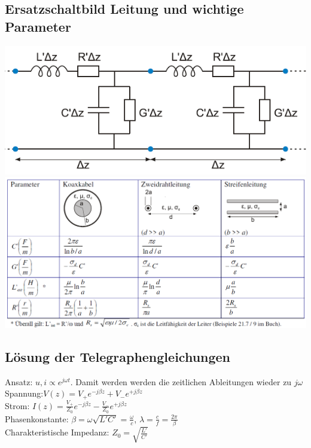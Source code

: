\documentclass[english]{latex4ei/latex4ei_sheet}
\begin{document}
\begin{sectionbox}
	\subsection{Ersatzschaltbild Leitung und wichtige Parameter}
	\includegraphics[width = \columnwidth]{./img/ersatzschaltbild_leitung.png}\\
	\includegraphics[width = \columnwidth]{./img/parameter_leitungen.png}\\
\end{sectionbox}
\begin{sectionbox}
	\subsection{Lösung der Telegraphengleichungen}
	Ansatz: $u,i \propto e^{j\omega t}$. Damit werden werden die zeitlichen Ableitungen wieder zu $j\omega$\\
	
	Spannung:\qquad $V(z) = V_+ e^{-j\beta z} + V_- e^{+j\beta z}$\\
	Strom:	\qquad$I(z) = \frac{V_+}{Z_0} e^{-j\beta z} - \frac{V_-}{Z_0} e^{+j\beta z}$\\
	Phasenkonstante: $\beta = \omega\sqrt{L' C'} = \frac{\omega}{c}$, $\lambda = \frac{c}{f} = \frac{2\pi}{\beta}$\\
	Charakteristische Impedanz: $Z_0 = \sqrt{\frac{L'}{C'}}$
	
\end{sectionbox}
\end{document}
